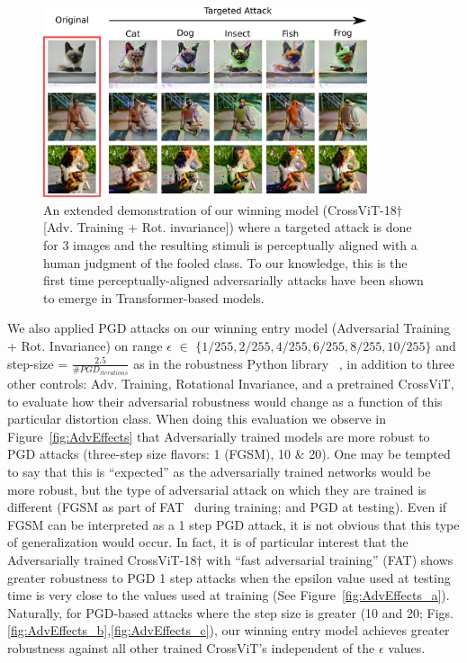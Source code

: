 \documentclass{article} %
\begin{document}
\begin{figure}[!t]
     \includegraphics[width=0.85\textwidth]{src/advimage.pdf}
     \centering
     \caption{An extended demonstration of our winning model (CrossViT-18$\dagger$ [Adv. Training + Rot. invariance]) where a targeted attack is done for 3 images and the resulting stimuli is perceptually aligned with a human judgment of the fooled class. To our knowledge, this is the first time perceptually-aligned adversarially attacks have been shown to emerge in Transformer-based models.}
     \label{fig:adversarial-examples}
 \end{figure}


We also applied PGD attacks on our winning entry model (Adversarial Training + Rot. Invariance) on range $\epsilon$ $\in$ $\{ 1/255, 2/255, 4/255, 6/255, 8/255, 10/255 \}$ and step-size = $\frac{2.5}{ \# PGD_{iterations}}$ as in the robustness Python library~\citep{robustness} , in addition to three other controls: Adv. Training, Rotational Invariance, and a pretrained CrossViT, to evaluate how their adversarial robustness would change as a function of this particular distortion class. When doing this evaluation we observe in Figure~\ref{fig:AdvEffects} that Adversarially trained models are more robust to PGD attacks (three-step size flavors: 1 (FGSM), 10 \& 20). One may be tempted to say that this is ``expected'' as the adversarially trained networks would be more robust, but the type of adversarial attack on which they are trained is different (FGSM as part of FAT~\citep{wong2020fast} during training; and PGD at testing). Even if FGSM can be interpreted as a 1 step PGD attack, it is not obvious that this type of generalization would occur. In fact, it is of particular interest that the Adversarially trained CrossViT-18$\dagger$ with ``fast adversarial training'' (FAT) shows greater robustness to PGD 1 step attacks when the epsilon value used at testing time is very close to the values used at training (See Figure~\ref{fig:AdvEffects_a}). Naturally, for PGD-based attacks where the step size is greater (10 and 20; Figs. \ref{fig:AdvEffects_b},\ref{fig:AdvEffects_c}), our winning entry model achieves greater robustness against all other trained CrossViT's independent of the $\epsilon$ values.  
\end{document}
